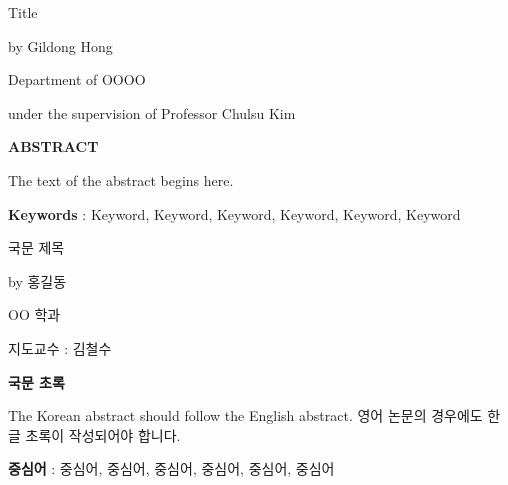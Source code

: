 \documentclass{report}
\begin{document}
\newpage 
{} %
\begin{center}
\LARGE Title %
\par\vspace{20pt}
\normalsize by Gildong Hong\par %
Department of OOOO\par
under the supervision of Professor Chulsu Kim %
\par\vspace{20pt}
\large \textbf{ABSTRACT}
\end{center}
\normalsize
The text of the abstract begins here. 
\par\vspace{100pt}
\textbf{Keywords} : Keyword, Keyword, Keyword, Keyword, Keyword, Keyword

\newpage 
\begin{center}
\LARGE 국문 제목 %
\par\vspace{20pt}
\normalsize by 홍길동\par %
OO 학과\par %
지도교수 : 김철수
\par\vspace{20pt}
\large \textbf{국문 초록}
\end{center}
\normalsize
The Korean abstract should follow the English abstract.
영어 논문의 경우에도 한글 초록이 작성되어야 합니다.
\par\vspace{100pt}
\textbf{중심어} : 중심어, 중심어, 중심어, 중심어, 중심어, 중심어
\end{document}
